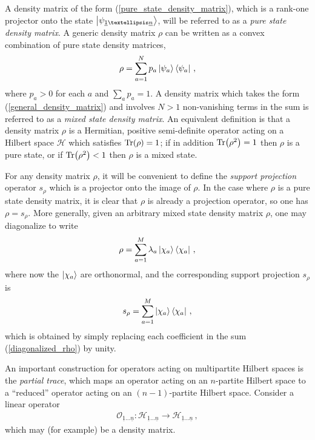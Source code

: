 \documentclass[12pt]{article}
\newcommand{\ul}[1]{{\underline{#1}}}
\numberwithin{equation}{section}
\begin{document}
A density matrix of the form (\ref{pure_state_density_matrix}), which is a rank-one projector onto the state $\ket{\psi_{\ul{1} \ldots \ul{n}}}$, will be referred to as a \emph{pure state density matrix}. A generic density matrix $\rho$ can be written as a convex combination of pure state density matrices,
%
\begin{align}\label{general_density_matrix}
    \rho = \sum_{a = 1}^{N} p_a \ket{\psi_a} \bra{\psi_a} \, ,
\end{align}
%
where $p_a > 0$ for each $a$ and $\sum_a p_a = 1$. A density matrix which takes the form (\ref{general_density_matrix}) and involves $N > 1$ non-vanishing terms in the sum is referred to as a \emph{mixed state density matrix}. An equivalent definition is that a density matrix $\rho$ is a Hermitian, positive semi-definite operator acting on a Hilbert space $\mathcal{H}$ which satisfies $\Tr ( \rho ) = 1$; if in addition $\Tr ( \rho^2 ) = 1$ then $\rho$ is a pure state, or if $\Tr ( \rho^2 ) < 1$ then $\rho$ is a mixed state.

For any density matrix $\rho$, it will be convenient to define the \emph{support projection} operator $s_\rho$ which is a projector onto the image of $\rho$. In the case where $\rho$ is a pure state density matrix, it is clear that $\rho$ is already a projection operator, so one has $\rho = s_\rho$. More generally, given an arbitrary mixed state density matrix $\rho$, one may diagonalize to write
%
\begin{align}\label{diagonalized_rho}
    \rho = \sum_{a = 1}^{M} \lambda_a \ket{\chi_a} \bra{\chi_a} \, ,
\end{align}
%
where now the $\ket{\chi_a}$ are orthonormal, and the corresponding support projection $s_\rho$ is
%
\begin{align}\label{supp_proj_defn}
    s_\rho = \sum_{a=1}^{M} \ket{\chi_a} \bra{\chi_a} \, ,
\end{align}
%
which is obtained by simply replacing each coefficient in the sum (\ref{diagonalized_rho}) by unity.

An important construction for operators acting on multipartite Hilbert spaces is the \emph{partial trace}, which maps an operator acting on an $n$-partite Hilbert space to a ``reduced'' operator acting on an $(n-1)$-partite Hilbert space. Consider a linear operator
%
\begin{align}
    \mathcal{O}_{\ul{1} \ldots \ul{n}} : \mathcal{H}_{\ul{1} \ldots \ul{n}} \to \mathcal{H}_{\ul{1} \ldots \ul{n}} \, ,
\end{align}
%
which may (for example) be a density matrix. 
\end{document}
